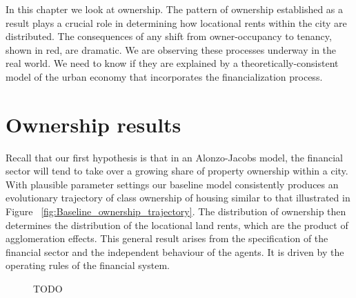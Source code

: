 In this chapter we look at ownership. The pattern of ownership established as a result plays a crucial role in determining how locational rents within the city are distributed. The consequences of any shift from owner-occupancy to tenancy, shown in red, are dramatic. 
We are observing these processes underway in the real world. We need to know if they are explained by a theoretically-consistent model of the urban economy that incorporates the financialization process.

\section{Ownership results}

Recall that our first hypothesis is that in an \Gls{Alonzo-Jacobs model}, the financial sector will tend to take over a growing share of property ownership within a city. 
With  plausible parameter settings our baseline model consistently produces an evolutionary trajectory of class ownership of housing similar to that illustrated in Figure ~\ref{fig:Baseline_ownership_trajectory}. The distribution of ownership then determines the distribution of the locational land rents, which are the product of agglomeration effects. This general result arises from the specification of the financial sector and the independent behaviour of the agents. It is driven by the operating rules of the financial system. 

\begin{figure}
\centering
{}
\caption{TODO}
\label{fig:enter-label}
\end{figure}

